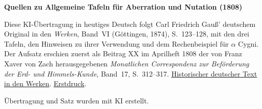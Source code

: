 \clearpage\thispagestyle{empty}
\begin{center}\textbf{Quellen zu Allgemeine Tafeln für Aberration und Nutation (1808)}\end{center}
\noindent Diese KI-Übertragung in heutiges Deutsch folgt Carl Friedrich Gauß’ deutschem Original in den \textit{Werken}, Band~VI (Göttingen, 1874), S.~123--128, mit den drei Tafeln, den Hinweisen zu ihrer Verwendung und dem Rechenbeispiel für $\alpha$ Cygni. Der Aufsatz erschien zuerst als Beitrag XX im Aprilheft 1808 der von Franz Xaver von Zach herausgegebenen \textit{Monatlichen Correspondenz zur Beförderung der Erd- und Himmels-Kunde}, Band~17, S.~312--317. \href{https://gdz.sub.uni-goettingen.de/id/PPN236007467}{Historischer deutscher Text in den Werken}. \href{https://www.digitale-sammlungen.de/en/view/bsb10538608?page=318}{Erstdruck}.
\par\smallskip\noindent Übertragung und Satz wurden mit KI erstellt.
\clearpage
